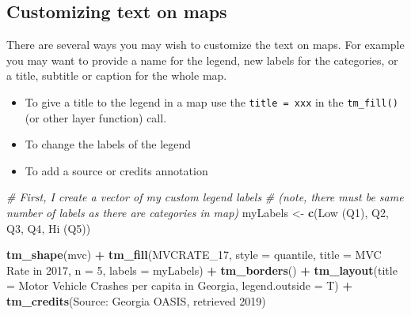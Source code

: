 \documentclass[
]{book}
\newenvironment{Shaded}{\begin{snugshade}}{\end{snugshade}}
\newcommand{\AttributeTok}[1]{\textcolor[rgb]{0.13,0.29,0.53}{#1}}
\newcommand{\CommentTok}[1]{\textcolor[rgb]{0.56,0.35,0.01}{\textit{#1}}}
\newcommand{\DecValTok}[1]{\textcolor[rgb]{0.00,0.00,0.81}{#1}}
\newcommand{\FunctionTok}[1]{\textcolor[rgb]{0.13,0.29,0.53}{\textbf{#1}}}
\newcommand{\NormalTok}[1]{#1}
\newcommand{\OtherTok}[1]{\textcolor[rgb]{0.56,0.35,0.01}{#1}}
\newcommand{\SpecialCharTok}[1]{\textcolor[rgb]{0.81,0.36,0.00}{\textbf{#1}}}
\newcommand{\StringTok}[1]{\textcolor[rgb]{0.31,0.60,0.02}{#1}}
\providecommand{\tightlist}{%
  \setlength{\itemsep}{0pt}\setlength{\parskip}{0pt}}
\begin{document}
\hypertarget{customizing-text-on-maps}{%
\subsection{Customizing text on maps}\label{customizing-text-on-maps}}

There are several ways you may wish to customize the text on maps. For example you may want to provide a name for the legend, new labels for the categories, or a title, subtitle or caption for the whole map.

\begin{itemize}
\tightlist
\item
  To give a title to the legend in a map use the \texttt{title\ =\ \textquotesingle{}xxx\textquotesingle{}} in the \texttt{tm\_fill()} (or other layer function) call.
\item
  To change the labels of the legend
\item
  To add a source or credits annotation
\end{itemize}

\begin{Shaded}
\begin{Highlighting}[]
  \CommentTok{\# First, I create a vector of my custom legend labels}
  \CommentTok{\# (note, there must be same number of labels as there are categories in map)}
\NormalTok{myLabels }\OtherTok{\textless{}{-}} \FunctionTok{c}\NormalTok{(}\StringTok{\textquotesingle{}Low (Q1)\textquotesingle{}}\NormalTok{, }\StringTok{\textquotesingle{}Q2\textquotesingle{}}\NormalTok{, }\StringTok{\textquotesingle{}Q3\textquotesingle{}}\NormalTok{, }\StringTok{\textquotesingle{}Q4\textquotesingle{}}\NormalTok{, }\StringTok{\textquotesingle{}Hi (Q5)\textquotesingle{}}\NormalTok{)}

\FunctionTok{tm\_shape}\NormalTok{(mvc) }\SpecialCharTok{+}
  \FunctionTok{tm\_fill}\NormalTok{(}\StringTok{\textquotesingle{}MVCRATE\_17\textquotesingle{}}\NormalTok{,}
          \AttributeTok{style =} \StringTok{\textquotesingle{}quantile\textquotesingle{}}\NormalTok{,}
          \AttributeTok{title =} \StringTok{\textquotesingle{}MVC Rate in 2017\textquotesingle{}}\NormalTok{,}
          \AttributeTok{n =} \DecValTok{5}\NormalTok{, }
          \AttributeTok{labels =}\NormalTok{ myLabels) }\SpecialCharTok{+}
  \FunctionTok{tm\_borders}\NormalTok{() }\SpecialCharTok{+}
\FunctionTok{tm\_layout}\NormalTok{(}\AttributeTok{title =} \StringTok{\textquotesingle{}Motor Vehicle Crashes per capita in Georgia\textquotesingle{}}\NormalTok{,}
          \AttributeTok{legend.outside =}\NormalTok{ T) }\SpecialCharTok{+}
\FunctionTok{tm\_credits}\NormalTok{(}\StringTok{\textquotesingle{}Source: Georgia OASIS, retrieved 2019\textquotesingle{}}\NormalTok{)}
\end{Highlighting}
\end{Shaded}
\end{document}
